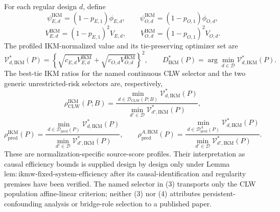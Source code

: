 For each regular design \(d\), define
\[
 \psi_{E,d}^{\mathrm{IKM}}=(1-p_{E,1})\phi_{E,d},
 \qquad
 \psi_{O,d}^{\mathrm{IKM}}=(1-p_{O,1})\phi_{O,d},
\]
\[
 V_{E,d}^{\mathrm{IKM}}=(1-p_{E,1})^2V_{E,d},
 \qquad
 V_{O,d}^{\mathrm{IKM}}=(1-p_{O,1})^2V_{O,d}.             \tag{1}
\]
The profiled IKM-normalized value and its tie-preserving optimizer set are
\[
 \mathcal V_{d,\mathrm{IKM}}^*(P)
 =\left\{
 \sqrt{c_{E,d}V_{E,d}^{\mathrm{IKM}}}
 +\sqrt{c_{O,d}V_{O,d}^{\mathrm{IKM}}}
 \right\}^2,
 \qquad
 D_{\mathrm{IKM}}^*(P)
 =\arg\min_{d\in\mathcal D}\mathcal V_{d,\mathrm{IKM}}^*(P). \tag{2}
\]
The best-tie IKM ratios for the named continuous CLW selector and the two generic unrestricted-risk selectors are, respectively,
\[
 \rho_{\mathrm{CLW}}^{\mathrm{IKM}}(P;B)
 =\frac{\min_{d\in\mathcal D_{\mathrm{CLW}}(P;B)}
 \mathcal V_{d,\mathrm{IKM}}^*(P)}
 {\min_{d'\in\mathcal D}\mathcal V_{d',\mathrm{IKM}}^*(P)}, \tag{3}
\]
\[
 \rho_{\mathrm{pred}}^{\mathrm{IKM}}(P)
 =\frac{\min_{d\in\mathcal D_{\mathrm{pred}}(P)}
 \mathcal V_{d,\mathrm{IKM}}^*(P)}
 {\min_{d'\in\mathcal D}\mathcal V_{d',\mathrm{IKM}}^*(P)},
 \qquad
 \rho_{\mathrm{pred}}^{A,\mathrm{IKM}}(P)
 =\frac{\min_{d\in\mathcal D_{\mathrm{pred}}^A(P)}
 \mathcal V_{d,\mathrm{IKM}}^*(P)}
 {\min_{d'\in\mathcal D}\mathcal V_{d',\mathrm{IKM}}^*(P)}. \tag{4}
\]
These are normalization-specific source-score profiles. Their interpretation as causal efficiency bounds is supplied design by design only under Lemma~\(\mathrm{lem{:}ikmw\text{-}fixed\text{-}system\text{-}efficiency}\) after its causal-identification and regularity premises have been verified. The named selector in (3) transports only the CLW population affine-linear criterion; neither (3) nor (4) attributes persistent-confounding analysis or bridge-role selection to a published paper.